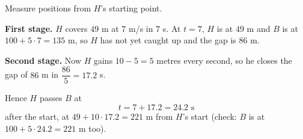 Measure positions from $H$'s starting point.

\textbf{First stage.} $H$ covers $49$ m at $7$ m/s in $7$ s. At $t=7$, $H$ is at $49$ m and $B$ is at $100+5\cdot7=135$ m, so $H$ has not yet caught up and the gap is $86$ m.

\textbf{Second stage.} Now $H$ gains $10-5=5$ metres every second, so he closes the gap of $86$ m in $\dfrac{86}{5}=17.2$ s.

Hence $H$ passes $B$ at
\[
t=7+17.2=\boxed{24.2\text{ s}}
\]
after the start, at $49+10\cdot17.2=221$ m from $H$'s start (check: $B$ is at $100+5\cdot24.2=221$ m too).
